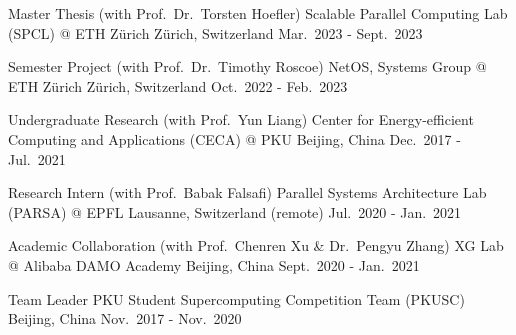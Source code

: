
\begin{cventries}

  \cventry
    {Master Thesis (with Prof.\ Dr.\ Torsten Hoefler)} %
    {Scalable Parallel Computing Lab (SPCL) @ ETH Z\"urich} %
    {Z\"urich, Switzerland} %
    {Mar.\ 2023 - Sept.\ 2023} %
    {}

  \cventry
    {Semester Project (with Prof.\ Dr.\ Timothy Roscoe)} %
    {NetOS, Systems Group @ ETH Z\"urich} %
    {Z\"urich, Switzerland} %
    {Oct.\ 2022 - Feb.\ 2023} %
    {}

  \cventry
    {Undergraduate Research (with Prof.\ Yun Liang)} %
    {Center for Energy-efficient Computing and Applications (CECA) @ PKU} %
    {Beijing, China} %
    {Dec.\ 2017 - Jul.\ 2021} %
    {}

  \cventry
    {Research Intern (with Prof.\ Babak Falsafi)} %
    {Parallel Systems Architecture Lab (PARSA) @ EPFL} %
    {Lausanne, Switzerland (remote)} %
    {Jul.\ 2020 - Jan.\ 2021} %
    {}

  \cventry
    {Academic Collaboration (with Prof.\ Chenren Xu \& Dr.\ Pengyu Zhang)} %
    {XG Lab @ Alibaba DAMO Academy} %
    {Beijing, China} %
    {Sept.\ 2020 - Jan.\ 2021} %
    {}

  \cventry
    {Team Leader} %
    {PKU Student Supercomputing Competition Team (PKUSC)} %
    {Beijing, China} %
    {Nov.\ 2017 - Nov.\ 2020} %
    {}

\end{cventries}

